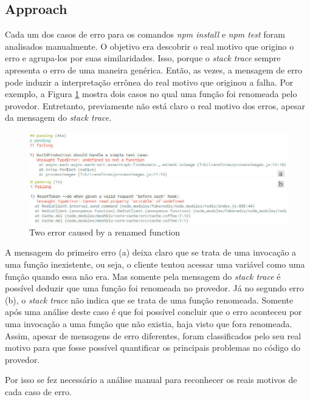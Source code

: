 \subsection{Approach}
\label{apr:rq2}

Cada um dos casos de erro para os comandos \textit{npm install} e \textit{npm test} foram analisados manualmente. O objetivo era descobrir o real motivo que origino o erro e agrupa-los por suas similaridades. Isso, porque o \textit{stack trace} sempre apresenta o erro de uma maneira genérica. Então, as vezes, a mensagem de erro pode induzir a interpretação errônea do real motivo que originou a falha. Por exemplo, a Figura \ref{fig:error_category} mostra dois casos no qual uma função foi renomeada pelo provedor. Entretanto, previamente não está claro o real motivo dos erros, apesar da mensagem do \textit{stack trace}.

\begin{figure}[!h]
    \centering
    \includegraphics[scale=0.5]{figuras/error_category.jpeg}
    \caption{Two error caused by a renamed function}
    \label{fig:error_category}
\end{figure}

A mensagem do primeiro erro (a) deixa claro que se trata de uma invocação a uma função inexistente, ou seja, o cliente tentou acessar uma variável como uma função quando essa não era. Mas somente pela mensagem do \textit{stack trace} é possível deduzir que uma função foi renomeada no provedor. Já no segundo erro (b), o \textit{stack trace} não indica que se trata de uma função renomeada. Somente após uma análise deste caso é que foi possível concluir que o erro aconteceu por uma invocação a uma função que não existia, haja visto que fora renomeada. Assim, apesar de mensagens de erro diferentes, foram classificados pelo seu real motivo para que fosse possível quantificar os principais problemas no código do provedor.

Por isso se fez necessário a análise manual para reconhecer os reais motivos de cada caso de erro.

